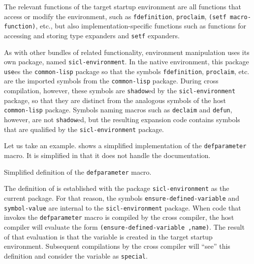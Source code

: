 The relevant functions of the target startup environment are all \cl{}
functions that access or modify the environment, such as
\texttt{fdefinition}, \texttt{proclaim}, \texttt{(setf
  macro-function)}, etc., but also implementation-specific functions
such as functions for accessing and storing type expanders and
\texttt{setf} expanders.

As with other bundles of related functionality, environment
manipulation uses its own package, named \texttt{sicl-environment}.
In the native environment, this package \texttt{use}es the
\texttt{common-lisp} package so that the symbols \texttt{fdefinition},
\texttt{proclaim}, etc. are the imported symbols from the
\texttt{common-lisp} package.  During cross compilation, however,
these symbols are \texttt{shadow}ed by the \texttt{sicl-environment}
package, so that they are distinct from the analogous symbols of the
host \texttt{common-lisp} package.  Symbols naming macros such as
\texttt{declaim} and \texttt{defun}, however, are not
\texttt{shadow}ed, but the resulting expansion code contains symbols
that are qualified by the \texttt{sicl-environment} package.  

Let us take an example.   shows a
simplified implementation of the \texttt{defparameter} macro.  It is
simplified in that it does not handle the documentation. 

\begin{codefragment}
\caption{\label{code-defparameter}
Simplified definition of the \texttt{defparameter} macro.}
\end{codefragment}

The definition of  is established with the
package \texttt{sicl-environment} as the current package.  For that
reason, the symbols \texttt{ensure-defined-variable} and
\texttt{symbol-value} are internal to the \texttt{sicl-environment}
package.  When code that invokes the \texttt{defparameter} macro is
compiled by the cross compiler, the host compiler will evaluate the
form \texttt{(ensure-defined-variable ,name)}.  The result of that
evaluation is that the variable is created in the target startup
environment.  Subsequent compilations by the cross compiler will
``see'' this definition and consider the variable as \texttt{special}.
